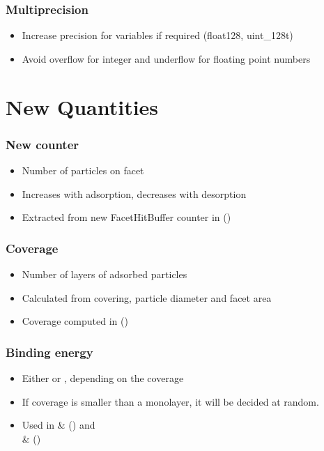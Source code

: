 \subsubsection{Multiprecision}
\begin{itemize}[noitemsep,topsep=0pt, partopsep=0pt]
\item Increase precision for variables if required (float128, uint\_128t)
\item Avoid overflow for integer and underflow for floating point numbers
\end{itemize}
\newpage
\section{New Quantities}
\label{sub:quant}
\subsubsection{New counter }
\begin{itemize}[noitemsep,topsep=0pt, partopsep=0pt]
\item Number of particles on facet
\item Increases with adsorption, decreases with desorption
\item Extracted from new FacetHitBuffer counter in  ()
\end{itemize}

\subsubsection{Coverage}
\begin{itemize}[noitemsep,topsep=0pt, partopsep=0pt]
\item Number of layers of adsorbed particles
\item Calculated from covering, particle diameter and facet area
\item Coverage computed in  ()
\end{itemize}

\subsubsection{Binding energy}
\begin{itemize}[noitemsep,topsep=0pt, partopsep=0pt]
\item Either  or , depending on the coverage
\item If coverage is smaller than a monolayer, it will be decided at random.
\item Used in  \&  () and\\  \&  ()
\end{itemize}

